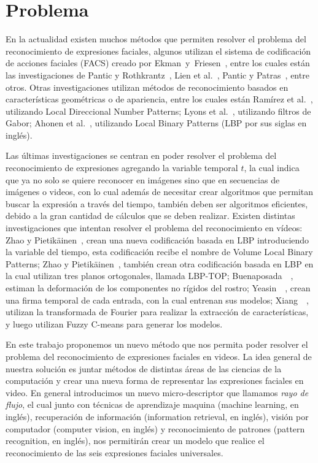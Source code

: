 \section{Problema}
\label{sec:problema}

En la actualidad existen muchos métodos que permiten resolver el problema del reconocimiento de expresiones faciales, algunos utilizan el sistema de codificación de acciones faciales (FACS) creado por Ekman~y~Friesen~\cite{Ekman1978}, entre los cuales están las investigaciones de Pantic y Rothkrantz~\cite{Pantic2004}, Lien et al.~\cite{Lien1998}, Pantic y Patras~\cite{Pantic2006}, entre otros. Otras investigaciones utilizan métodos de reconocimiento basados en características geométricas o de apariencia, entre los cuales están Ramírez et al.~\cite{RamirezRivera2013}, utilizando Local Direccional Number Patterns; Lyons et al.~\cite{Lyons1998}, utilizando filtros de Gabor; Ahonen et al.~\cite{Ahonen2006}, utilizando Local Binary Patterns (LBP por sus siglas en inglés).

Las últimas investigaciones se centran en poder resolver el problema del reconocimiento de expresiones agregando la variable temporal $t$, la cual indica que ya no solo se quiere reconocer en imágenes sino que en secuencias de imágenes o videos, con lo cual además de necesitar crear algoritmos que permitan buscar la expresión a través del tiempo, también deben ser algoritmos eficientes, debido a la gran cantidad de cálculos que se deben realizar. Existen distintas investigaciones que intentan resolver el problema del reconocimiento en vídeos: Zhao y Pietikäinen~\cite{Zhao2006}, crean una nueva codificación basada en LBP introduciendo la variable del tiempo, esta codificación recibe el nombre de Volume Local Binary Patterns; Zhao y Pietikäinen~\cite{Zhao2006}, también crean otra codificación basada en LBP en la cual utilizan tres planos ortogonales, llamada LBP-TOP; Buenaposada~\etal~\cite{Buenaposada2008}, estiman la deformación de los componentes no rígidos del rostro; Yeasin~\etal~\cite{Yeasin2004}, crean una firma temporal de cada entrada, con la cual entrenan sus modelos; Xiang~\etal~\cite{Xiang2008}, utilizan la transformada de Fourier para realizar la extracción de características, y luego utilizan Fuzzy C-means para generar los modelos.

En este trabajo proponemos un nuevo método que nos permita poder resolver el problema del reconocimiento de expresiones faciales en videos. La idea general de nuestra solución es juntar métodos de distintas áreas de las ciencias de la computación y crear una nueva forma de representar las expresiones faciales en video. En general introducimos un nuevo micro-descriptor que llamamos \textit{rayo de flujo}, el cual junto con técnicas de aprendizaje maquina (machine learning, en inglés), recuperación de información (information retrieval, en inglés), visión por computador (computer vision, en inglés) y reconocimiento de patrones (pattern recognition, en inglés), nos permitirán crear un modelo que realice el reconocimiento de las seis expresiones faciales universales. 

